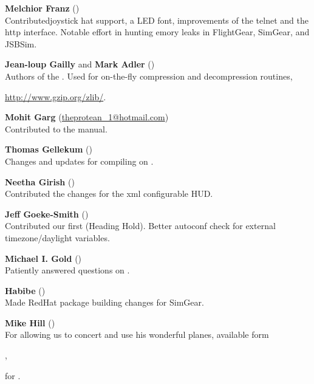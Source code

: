 \noindent \textbf{Melchior Franz} ()\\
  Contributedjoystick hat support, a LED font, improvements of the telnet and the http interface.
  Notable effort in hunting emory leaks in FlightGear, SimGear, and JSBSim.
  \medskip

\noindent \textbf{Jean-loup Gailly} and \textbf{Mark
Adler} ()\\
  Authors of the .  Used for on-the-fly compression and
  decompression routines,

  \href{http://www.gzip.org/zlib/}{http://www.gzip.org/zlib/}.
 \medskip

\noindent \textbf{Mohit Garg}
(\href{mailto:theprotean_1@hotmail.com}{theprotean\_1@hotmail.com})\\
 Contributed to the manual.
 \medskip

\noindent \textbf{Thomas Gellekum}
()\\
  Changes and updates for compiling on .
 \medskip

\noindent \textbf{Neetha Girish}
()\\
  Contributed the changes for the xml configurable HUD.
 \medskip

\noindent \textbf{Jeff Goeke-Smith}
()\\
  Contributed our first  (Heading Hold).
  Better autoconf check for external timezone/daylight variables.
 \medskip

\noindent \textbf{Michael I. Gold}
()\\
 Patiently answered questions on .
 \medskip

\noindent \textbf{Habibe} ()\\
 Made RedHat package building changes for SimGear.
 \medskip

\noindent \textbf{Mike Hill} ()\\
 For allowing us to concert and use his wonderful planes, available form
 \medskip

 ,

 \noindent
 for \FlightGear{}.
 \medskip

